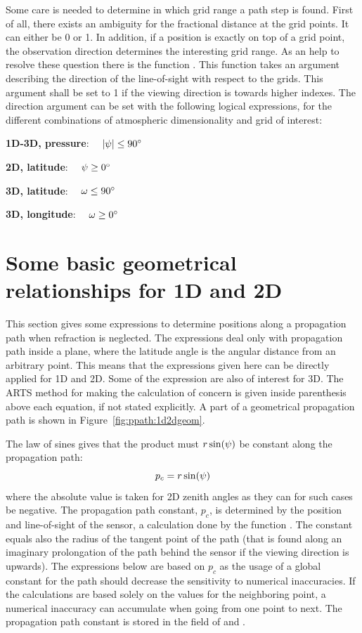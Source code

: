 Some care is needed to determine in which grid range a path step is
found. First of all, there exists an ambiguity for the fractional
distance at the grid points. It can either be 0 or 1. In addition, if
a position is exactly on top of a grid point, the observation
direction determines the interesting grid range. As an help to resolve
these question there is the function .
This function takes an argument describing the direction of the
line-of-sight with respect to the grids. This argument shall be set to
1 if the viewing direction is towards higher indexes. The direction
argument can be set with the following logical expressions, for the
different combinations of atmospheric dimensionality and grid of
interest:

 {\bf 1D-3D, pressure}: $\quad |\psi| \leq 90^\circ$

 {\bf 2D, latitude}: $\quad \psi \geq 0^\circ$

 {\bf 3D, latitude}: $\quad \omega \leq 90^\circ$

 {\bf 3D, longitude}: $\quad \omega \geq 0^\circ$





\section{Some basic geometrical relationships for 1D and 2D}
\label{sec:ppath:basicgeom}

This section gives some expressions to determine positions along a
propagation path when refraction is neglected. The expressions deal
only with propagation path inside a plane, where the latitude angle is
the angular distance from an arbitrary point. This means that the
expressions given here can be directly applied for 1D and 2D. Some of
the expression are also of interest for 3D. The ARTS method for making
the calculation of concern is given inside parenthesis above each
equation, if not stated explicitly. A part of a geometrical
propagation path is shown in Figure~\ref{fig:ppath:1d2dgeom}.

The law of sines gives that the product must $r\sin(\psi)$ be
constant along the propagation path:
\begin{equation}
  p_c = r\sin(\psi)
  \label{eq:ppath:geomconst}
\end{equation}
where the absolute value is taken for 2D zenith angles as they can for
such cases be negative. The propagation path constant, $p_c$, is
determined by the position and line-of-sight of the sensor, a
calculation done by the function . The
constant equals also the radius of the tangent point of the path (that
is found along an imaginary prolongation of the path behind the sensor
if the viewing direction is upwards). The expressions below are based
on $p_c$ as the usage of a global constant for the path should
decrease the sensitivity to numerical inaccuracies. If the
calculations are based solely on the values for the neighboring
point, a numerical inaccuracy can accumulate when going from one point
to next. The propagation path constant is stored in the field
 of  and .

